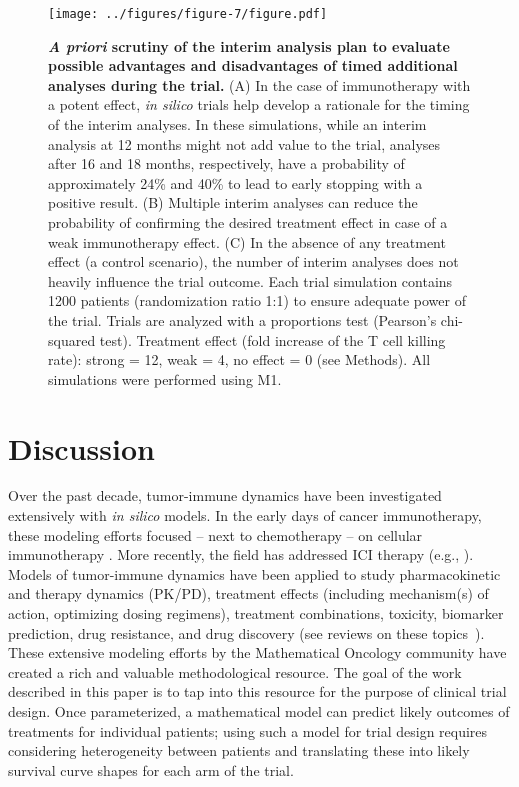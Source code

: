 \documentclass[a4paper,10pt]{article}
\newcommand{\newbit}{\color{red!70!black}}
\begin{document}
\begin{figure}

\centering
\internallinenumbers
\texttt{[image: ../figures/figure-7/figure.pdf]}
	\caption{
	{\bfseries \emph{A priori} scrutiny of the interim analysis plan to evaluate
		possible advantages and disadvantages of timed additional analyses
		during the trial.}
		(A) In the case of immunotherapy with a potent effect, 
		\emph{in silico} trials help develop a rationale for the timing of the
		interim analyses. In these simulations, while an interim analysis at 12 months might
		not add value to the trial, analyses after 16 and 18 months,
		respectively, have a probability of approximately 24\% and 40\%
		to lead to early stopping with a positive result. (B) Multiple
		interim analyses can reduce the probability of confirming the
		desired treatment effect in case of a weak immunotherapy
		effect. (C) In the absence of any treatment effect (a control
		scenario), the number of interim analyses does not heavily
		influence the trial outcome. Each trial simulation contains
		1200 patients (randomization ratio 1:1) to ensure adequate
		power of the trial. Trials are analyzed with a proportions test
		(Pearson's chi-squared test). Treatment effect (fold increase
		of the T cell killing rate): strong = 12, weak = 4, no effect
		= 0 (see Methods). All simulations were performed using M1.
	}
\label{fig:fig6}
\end{figure}



\clearpage

\section*{Discussion}
\label{discussion}

{\newbit{}
Over the past decade, tumor-immune dynamics have been investigated extensively with 
\emph{in silico} models. In the early days of cancer immunotherapy, these modeling
efforts focused -- next to chemotherapy \cite{Agur2010} -- on cellular immunotherapy
\cite{Gupta2015,Walker2016}. More recently, the field has addressed ICI therapy 
(e.g., \cite{Tsur2019,Butner2020,Coletti2021}). 
Models of tumor-immune dynamics have been applied to study 
pharmacokinetic and therapy dynamics (PK/PD), treatment effects
(including mechanism(s) of action, optimizing dosing regimens), treatment combinations, 
toxicity, biomarker prediction, drug resistance, and drug discovery (see reviews on 
these topics~\cite{Gupta2015,Konstorum2017,Brown2018,Yates2020,Agur2016,dePillis2014,Craig2020}).
These extensive modeling efforts by the Mathematical Oncology community have created a rich and 
valuable methodological resource. The goal of the work described in this paper is to 
tap into this resource for the purpose of clinical trial design. Once parameterized, a
mathematical model can predict likely outcomes of treatments for individual patients;
using such a model for trial design requires considering heterogeneity between patients 
and translating these into likely survival curve shapes for each arm of the trial.
}
\end{document}
